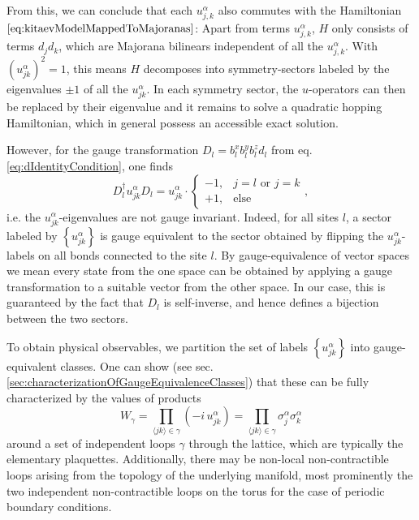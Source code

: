 \documentclass[%
fontsize=12pt, %
twoside=off %
]{scrbook}
\begin{document}
From this, we can conclude that each $u_{j,k}^\alpha$ also commutes with the Hamiltonian $\ref{eq:kitaevModelMappedToMajoranas}$: Apart from terms $u_{j,k}^\alpha$, $H$ only consists of terms $d_jd_k$, which are Majorana bilinears independent of all the $u_{j,k}^\alpha$. With $\left(u_{jk}^\alpha\right)^2=1$, this means $H$ decomposes into symmetry-sectors labeled by the eigenvalues $\pm 1$ of all the $u_{jk}^\alpha$. In each symmetry sector, the $u$-operators can then be replaced by their eigenvalue and it remains to solve a quadratic hopping Hamiltonian, which in general possess an accessible exact solution.

However, for the gauge transformation $D_l=b_l^xb_l^yb_l^zd_l$ from eq. \ref{eq:dIdentityCondition}, one finds
\begin{equation}
	 D_l^\dagger u_{jk}^\alpha D_l  =  u_{jk}^\alpha \cdot
	\begin{cases}
		-1, & j=l\text{ or } j=k\\
		+1, & \text{else}
	\end{cases},
	\label{eq:uIsNotGaugeInvariant}
\end{equation}
i.e. the $u_{jk}^\alpha$-eigenvalues are not gauge invariant. Indeed, for all sites $l$, a sector labeled by $\left\{u_{jk}^\alpha\right\}$ is gauge equivalent to the sector obtained by flipping the $u_{jk}^\alpha$-labels on all bonds connected to the site $l$. By gauge-equivalence of vector spaces we mean every state from the one space can be obtained by applying a gauge transformation to a suitable vector from the other space. In our case, this is guaranteed by the fact that $D_l$ is self-inverse, and hence defines a bijection between the two sectors.

To obtain physical observables, we partition the set of labels $\left\{u_{jk}^\alpha\right\}$ into gauge-equivalent classes. One can show (see sec. \ref{sec:characterizationOfGaugeEquivalenceClasses}) that these can be fully characterized by the values of products
\begin{equation}
	W_\gamma = \prod_{\langle jk\rangle\in\gamma}\left(-i\, u^\alpha_{jk}\right) =
	\prod_{\langle jk\rangle\in\gamma} \sigma_j^\alpha\sigma_k^\alpha
	\label{eq:defWilsonLoop}
\end{equation}
around a set of independent loops $\gamma$ through the lattice, which are typically the elementary plaquettes. Additionally, there may be non-local non-contractible loops arising from the topology of the underlying manifold, most prominently the two independent non-contractible loops on the torus for the case of periodic boundary conditions.
\end{document}
